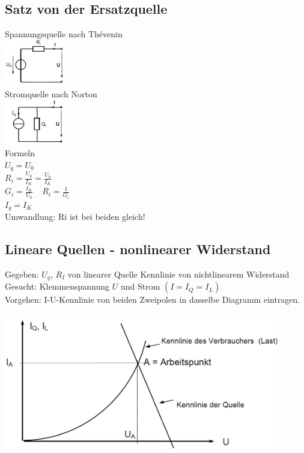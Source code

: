 \subsection{Satz von der Ersatzquelle}
\begin{multicols}{3}
Spannungsquelle nach Thévenin\\
\includegraphics[width=0.2\textwidth]{pics/dcnet/ersatz_spannung}\\
Stromquelle nach Norton\\
\includegraphics[width=0.2\textwidth]{pics/dcnet/ersatz_strom}\\
Formeln\\
$ U_q = U_0 $\\
$ R_i = \frac{U_q}{I_K} = \frac{U_0}{I_K} $\\
$ G_i = \frac{I_K}{U_0}\ \ \ \ \ R_i = \frac{1}{G_i}$\\
$ I_q = I_K $\\
Umwandlung: Ri ist bei beiden gleich!
\end{multicols}

\subsection{Lineare Quellen - nonlinearer Widerstand}
\begin{minipage}{12cm}
Gegeben: $U_q$, $R_I$ von linearer Quelle Kennlinie von nichtlinearem Widerstand\\
Gesucht: Klemmenspannung $U$ und Strom $(I = I_Q = I_L)$\\
Vorgehen: I-U-Kennlinie von beiden Zweipolen in dasselbe Diagramm eintragen.\\
\end{minipage}
\begin{minipage}{5cm}
\includegraphics[width=0.9\textwidth]{pics/quellen/nonlineUI}
\end{minipage}

